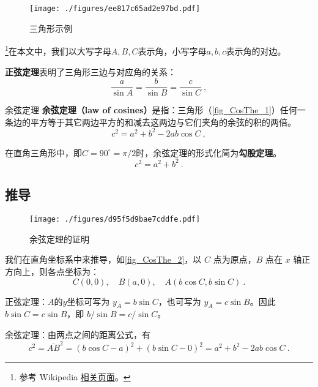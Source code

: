 \begin{figure}[ht]
\centering
\texttt{[image: ./figures/ee817c65ad2e97bd.pdf]}
\caption{三角形示例} \label{fig_CosThe_1}
\end{figure}

\footnote{参考 Wikipedia \href{https://en.wikipedia.org/wiki/Law_of_cosines}{相关页面}。}在本文中，我们以大写字母$A, B, C$表示角，小写字母$a, b, c$表示角的对边。

\textbf{正弦定理}表明了三角形三边与对应角的关系：
\begin{equation}
\frac{a}{\sin A} = \frac{b}{\sin B} = \frac{c}{\sin C} ~,
\end{equation}
\begin{theorem}{余弦定理}\label{the_CosThe_1}
\textbf{余弦定理（law of cosines）}是指：三角形（\autoref{fig_CosThe_1}）任何一条边的平方等于其它两边平方的和减去这两边与它们夹角的余弦的积的两倍。
\begin{equation}\label{eq_CosThe_1}
c^2=a^2 + b^2 - 2ab\cos C~,
\end{equation}
\end{theorem}


在直角三角形中，即$C=90^\circ = \pi / 2$时，余弦定理的形式化简为\textbf{勾股定理}。
\begin{equation}
c^2 = a^2 + b^2~.
\end{equation}

\subsection{推导}
\begin{figure}[ht]
\centering
\texttt{[image: ./figures/d95f5d9bae7cddfe.pdf]}
\caption{余弦定理的证明} \label{fig_CosThe_2}
\end{figure}
我们在直角坐标系中来推导，如\autoref{fig_CosThe_2}，以 $C$ 点为原点，$B$ 点在 $x$ 轴正方向上，则各点坐标为：
\begin{equation}
C(0,0),\quad B(a,0),\quad A(b\cos C,b\sin C)~.
\end{equation}

正弦定理：$A$的$y$坐标可写为 $y_A = b \sin C$，也可写为 $y_A = c \sin B$。因此 $b \sin C = c \sin B$，即 $b/ \sin B = c / \sin C$。

余弦定理：由两点之间的距离公式，有
\begin{equation}
c^2=\overline{AB}^2=(b\cos C-a)^2+(b\sin C-0)^2=a^2+b^2-2ab\cos C~.
\end{equation}

